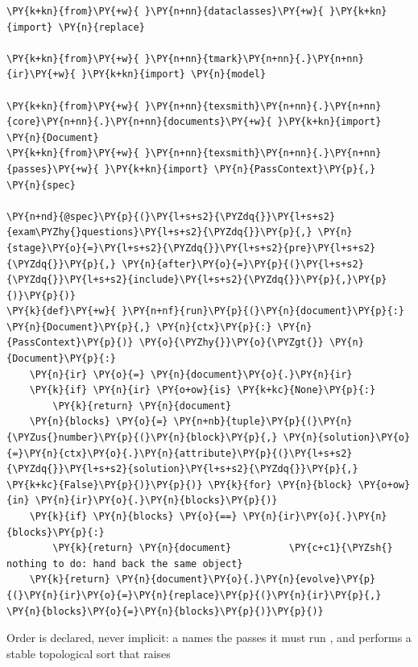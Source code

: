 \documentclass[a4paper,twoside]{article}
\begin{document}
\begin{tscode}[lang=python, engine=pygments]
\begin{Verbatim}[commandchars=\\\{\},breaklines, breakanywhere, commandchars=\\\{\}]
\PY{k+kn}{from}\PY{+w}{ }\PY{n+nn}{dataclasses}\PY{+w}{ }\PY{k+kn}{import} \PY{n}{replace}

\PY{k+kn}{from}\PY{+w}{ }\PY{n+nn}{tmark}\PY{n+nn}{.}\PY{n+nn}{ir}\PY{+w}{ }\PY{k+kn}{import} \PY{n}{model}

\PY{k+kn}{from}\PY{+w}{ }\PY{n+nn}{texsmith}\PY{n+nn}{.}\PY{n+nn}{core}\PY{n+nn}{.}\PY{n+nn}{documents}\PY{+w}{ }\PY{k+kn}{import} \PY{n}{Document}
\PY{k+kn}{from}\PY{+w}{ }\PY{n+nn}{texsmith}\PY{n+nn}{.}\PY{n+nn}{passes}\PY{+w}{ }\PY{k+kn}{import} \PY{n}{PassContext}\PY{p}{,} \PY{n}{spec}

\PY{n+nd}{@spec}\PY{p}{(}\PY{l+s+s2}{\PYZdq{}}\PY{l+s+s2}{exam\PYZhy{}questions}\PY{l+s+s2}{\PYZdq{}}\PY{p}{,} \PY{n}{stage}\PY{o}{=}\PY{l+s+s2}{\PYZdq{}}\PY{l+s+s2}{pre}\PY{l+s+s2}{\PYZdq{}}\PY{p}{,} \PY{n}{after}\PY{o}{=}\PY{p}{(}\PY{l+s+s2}{\PYZdq{}}\PY{l+s+s2}{include}\PY{l+s+s2}{\PYZdq{}}\PY{p}{,}\PY{p}{)}\PY{p}{)}
\PY{k}{def}\PY{+w}{ }\PY{n+nf}{run}\PY{p}{(}\PY{n}{document}\PY{p}{:} \PY{n}{Document}\PY{p}{,} \PY{n}{ctx}\PY{p}{:} \PY{n}{PassContext}\PY{p}{)} \PY{o}{\PYZhy{}}\PY{o}{\PYZgt{}} \PY{n}{Document}\PY{p}{:}
    \PY{n}{ir} \PY{o}{=} \PY{n}{document}\PY{o}{.}\PY{n}{ir}
    \PY{k}{if} \PY{n}{ir} \PY{o+ow}{is} \PY{k+kc}{None}\PY{p}{:}
        \PY{k}{return} \PY{n}{document}
    \PY{n}{blocks} \PY{o}{=} \PY{n+nb}{tuple}\PY{p}{(}\PY{n}{\PYZus{}number}\PY{p}{(}\PY{n}{block}\PY{p}{,} \PY{n}{solution}\PY{o}{=}\PY{n}{ctx}\PY{o}{.}\PY{n}{attribute}\PY{p}{(}\PY{l+s+s2}{\PYZdq{}}\PY{l+s+s2}{solution}\PY{l+s+s2}{\PYZdq{}}\PY{p}{,} \PY{k+kc}{False}\PY{p}{)}\PY{p}{)} \PY{k}{for} \PY{n}{block} \PY{o+ow}{in} \PY{n}{ir}\PY{o}{.}\PY{n}{blocks}\PY{p}{)}
    \PY{k}{if} \PY{n}{blocks} \PY{o}{==} \PY{n}{ir}\PY{o}{.}\PY{n}{blocks}\PY{p}{:}
        \PY{k}{return} \PY{n}{document}          \PY{c+c1}{\PYZsh{} nothing to do: hand back the same object}
    \PY{k}{return} \PY{n}{document}\PY{o}{.}\PY{n}{evolve}\PY{p}{(}\PY{n}{ir}\PY{o}{=}\PY{n}{replace}\PY{p}{(}\PY{n}{ir}\PY{p}{,} \PY{n}{blocks}\PY{o}{=}\PY{n}{blocks}\PY{p}{)}\PY{p}{)}
\end{Verbatim}
\end{tscode}
Order is declared, never implicit: a  names the passes it must run
, and  performs a stable topological sort that raises
\end{document}
